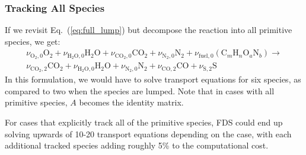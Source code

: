 \subsubsection{Tracking All Species}

If we revisit Eq.~(\ref{eq:full_lump}) but decompose the reaction into all primitive species, we get:
\begin{multline}\label{eq:prim}
\nu_{\mathrm{O}_{2},0}\mathrm{O}_2+\nu_{\mathrm{H}_{2}\mathrm{O},0}\mathrm{H}_2\mathrm{O}+\nu_{\mathrm{CO}_{2},0}\mathrm{CO}_2+\nu_{\mathrm{N}_{2},0}\mathrm{N}_2+\nu_{\mathrm{fuel},0}(\mbox{C}_m\mbox{H}_n\mbox{O}_a\mbox{N}_b) \longrightarrow \\
\nu_{\mathrm{CO}_{2},2}\mathrm{CO}_2+\nu_{\mathrm{H}_{2}\mathrm{O},0}\mathrm{H}_2\mathrm{O}+\nu_{\mathrm{N}_{2},0}\mathrm{N}_2+\nu_{\mathrm{CO},2}\mathrm{CO}+\nu_{\mathrm{S},2}\mathrm{S}
\end{multline}
In this formulation, we would have to solve transport equations for six species, as compared to two when the species are lumped. Note that in cases with all primitive species, $A$ becomes the identity matrix.

For cases that explicitly track all of the primitive species, FDS could end up solving upwards of 10-20 transport equations depending on the case, with each additional tracked species adding roughly 5\% to the computational cost.




